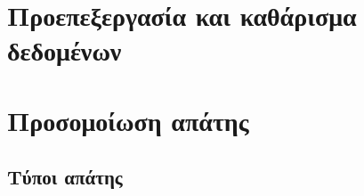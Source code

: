 \section{Προεπεξεργασία και καθάρισμα δεδομένων}
\section{Προσομοίωση απάτης}
\subsection{Τύποι απάτης}
